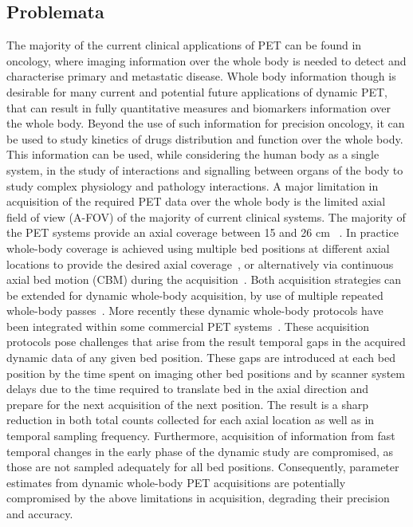 \subsection*{Problemata}
The majority of the current clinical applications of PET can be found in oncology, where imaging information over the whole body is needed to detect and characterise primary and metastatic disease. 
Whole body information though is desirable for many current and potential future applications of dynamic PET, that can result in fully quantitative measures and biomarkers information over the whole body. Beyond the use of such information for precision oncology, it can be used to study kinetics of drugs distribution and function over the whole body.
This information can be used, while considering the human body as a single system, in the study of interactions and signalling between organs of the body to study complex physiology and pathology interactions.
A major limitation in acquisition of the required PET data over the whole body is the limited axial field of view (A-FOV) of the majority of current clinical systems. The majority of the PET systems provide an axial coverage between 15 and 26 cm ~\cite{Vandenberghe2020}. 
In practice whole-body coverage is achieved using multiple bed positions at different axial locations to provide the desired axial coverage~\cite{Schubert1996}, or alternatively via continuous axial bed motion (CBM) during the acquisition~\cite{Panin2014}. 
Both acquisition strategies can be extended for dynamic whole-body acquisition, by use of multiple repeated whole-body passes~\cite {Karakatsanis2011,Karakatsanis2013,Rahmim2019}.
More recently these dynamic whole-body protocols have been integrated within some commercial PET systems~\cite{Hu2020}. 
These acquisition protocols pose challenges that arise from the result temporal gaps in the acquired dynamic data of any given bed position. These gaps are introduced at each bed position by the time spent on imaging other bed positions and by scanner system delays due to the time required to translate bed in the axial direction and prepare for the next acquisition of the next position. The result is a sharp reduction in both total counts collected for each axial location as well as in temporal sampling frequency. Furthermore, acquisition of information from fast temporal changes in the early phase of the dynamic study are compromised, as those are not sampled adequately for all bed positions. Consequently, parameter estimates from dynamic whole-body PET acquisitions are potentially compromised by the above limitations in acquisition, degrading their precision and accuracy.

